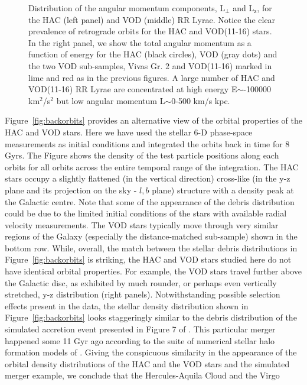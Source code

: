 \documentclass[fleqn,usenatbib]{mnras}
\begin{document}
\begin{figure}
		       	       	       	       \vspace{-0.45cm}
   \caption{Distribution of the angular momentum components, $\mathrm{L_{\perp}}$ and $\mathrm{L_{z}}$,  for the HAC (left panel) and VOD (middle) RR Lyrae. Notice the clear prevalence of retrograde orbits for the HAC and VOD(11-16) stars. In the right panel, we show the total angular momentum as a function of energy for the HAC (black circles), VOD (gray dots) and the two VOD sub-samples, Vivas Gr. 2 and VOD(11-16) marked in lime and red as in the previous figures. A large number of HAC and VOD(11-16) RR Lyrae are concentrated at high energy E$\sim$-100000 km$^{2}$/s$^{2}$ but low angular momentum L$\sim$0-500 km/s kpc.}
    \label{fig:energy}
\end{figure}
%
Figure~\ref{fig:backorbits} provides an alternative view of the
orbital properties of the HAC and VOD stars. Here we have used the
stellar 6-D phase-space measurements as initial conditions and
integrated the orbits back in time for 8 Gyrs. The Figure shows the
density of the test particle positions along each orbits for all
orbits across the entire temporal range of the integration. The HAC
stars occupy a slightly flattened (in the vertical direction)
cross-like (in the y-z plane and its projection on the sky - $l,b$
plane) structure with a density peak at the Galactic centre. Note that
some of the appearance of the debris distribution could be due to the
limited initial conditions of the stars with available radial velocity
measurements. The VOD stars typically move through very similar
regions of the Galaxy (especially the distance-matched sub-sample)
shown in the bottom row. While, overall, the match between the stellar
debris distributions in Figure~\ref{fig:backorbits} is striking, the
HAC and VOD stars studied here do not have identical orbital
properties. For example, the VOD stars travel further above the
Galactic disc, as exhibited by much rounder, or perhaps even
vertically stretched, y-z distribution (right panels).
%
Notwithstanding possible selection effects present in the data, the
stellar density distribution shown in Figure~\ref{fig:backorbits}
looks staggeringly similar to the debris distribution of the simulated
accretion event presented in Figure 7 of \citet{Simion2018}. This
particular merger happened some 11 Gyr ago according to the suite of
numerical stellar halo formation models of \citet{Bu05}. Giving the
conspicuous similarity in the appearance of the orbital density
distributions of the HAC and the VOD stars and the simulated merger
example, we conclude that the Hercules-Aquila Cloud and the Virgo
\end{document}
